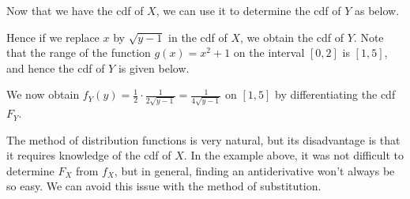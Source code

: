 \begin{examp}
\begin{center}
    \begin{minipage}{.5\textwidth}
        \centering
    \end{minipage}%
    \begin{minipage}{0.5\textwidth}
        \centering
\end{minipage}
\end{center}
\par
\noindent Now that we have the cdf of $X$, we can use it to determine the cdf of $Y$ as below.
\par
\noindent Hence if we replace $x$ by $\sqrt{y-1}$ in the cdf of $X$, we obtain the cdf of $Y$. Note that the range of the function $g(x) = x^2+1$ on the interval $[0,2]$ is $[1,5]$, and hence the cdf of $Y$ is given below.
\renewcommand*{\arraystretch}{1.35}
\renewcommand*{\arraystretch}{1}
\par
\noindent We now obtain $f_Y(y) = \frac{1}{2}\cdot \frac{1}{2\sqrt{y-1}} = \frac{1}{4\sqrt{y-1}}$ on $[1,5]$ by differentiating the cdf $F_Y$.
\end{examp}
\par
The method of distribution functions is very natural, but its disadvantage is that it requires knowledge of the cdf of $X$. In the example above, it was not difficult to determine $F_X$ from $f_X$, but in general, finding an antiderivative won't always be so easy. We can avoid this issue with the method of substitution.

